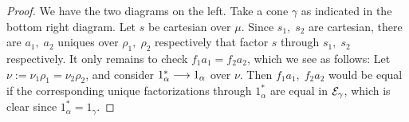 \begin{proof}
We have the two diagrams on the left. Take a cone $\gamma$ as indicated in the bottom right diagram. Let $s$ be cartesian over $\mu$. Since 
$s_1,\; s_2$ are cartesian, there are  $a_1,\;a_2$
 uniques over $\rho_1,\; \rho_2$ respectively that factor $s$ through 
$s_1,\; s_2$ respectively. It only remains to check  $f_1 a_1 = f_2 a_2$, which we see as follows: Let $\nu := \nu_1 \rho_1 = \nu_2 \rho_2$, 
and consider $1_\alpha^* \overset {} {\longrightarrow} 1_\alpha$ over $\nu$. Then 
$f_1 a_1,\; f_2 a_2$ would be equal if the corresponding unique factorizations through $1_\alpha^*$ are equal in $\mathcal{E}_\gamma$, which is clear since  
$1_\alpha^* = 1_\gamma$.
\end{proof}

\begin{comment}
Take a cone of the following diagram in $\cc{G}$.
 
 \[
\xymatrix  @+3ex{  & F(X) & \\
		  {} \ar [ur] ^{F(s_0)} \ar [dr] _{F(f_0)} & \beta  \ar @{-->} [u] _{\varphi_0} \ar @{-->} [d] _{\varphi_1} \ar @{-->} [l] _{\psi_0} \ar @{-->} [r] _{\psi_1} & {} \ar[ul]_{F(s_1)} \ar[dl]^{F(f_1)}\\
		    & \alpha &} 
 \] 
 
\noindent Let $X^* \mr{s} X$ be a cartesian morphism over $\varphi_0$. Take ($i=0,1$) $a_i$ the unique morphism over $\psi_i$ that factors $s$ through $s_i$. It follows that $f_0a_0=f_1a_1$ in $\cc{E}$ (\ref{terminal sobre phi}). Thus precomposing with $1/s$ we obtain $f_0/s_0=f_1/s_1$.
\end{comment} 
\begin{comment}
\begin{nobservation}
Notice that the data of a functor $F$ from a category $\cc{A}$ to a category $\cc{B}$ can be seen as a function $\cc{A} \mr{F} \cc{B}$ respecting the domain and codomain operations, together with a disjoint union of commutative triangles $F(h) = F(g)F(f)$ in $\cc{B}$, one for each commutative triangle $h = gf$ in $\cc{A}$.
\end{nobservation}
\end{comment}
